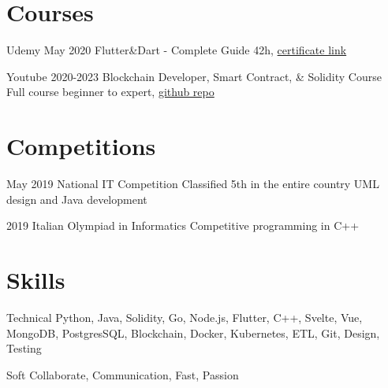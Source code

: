 \documentclass{tccv}
\begin{document}
\section{Courses}

\begin{yearlist}

\item[Udemy]{May 2020}
     {Flutter\&Dart - Complete Guide}
     {42h, \href{https://www.udemy.com/certificate/UC-c6f5a32f-babc-42f9-8a0a-6effadf9e7cd/}{certificate link}}

\item[Youtube]{2020-2023}
    {Blockchain Developer, Smart Contract, \& Solidity Course}
    {Full course beginner to expert, \href{https://github.com/Cyfrin/foundry-full-course-f23}{github repo}}

\end{yearlist}


\section{Competitions}

\begin{yearlist}

\item[]{May 2019}
     {National IT Competition}
     {Classified 5th in the entire country \newline
     UML design and Java development}

\item[]{2019}
    {Italian Olympiad in Informatics}
    {Competitive programming in C++}

\end{yearlist}


\section{Skills}

\begin{factlist}

\item{Technical}
     {Python, Java, Solidity, Go, Node.js, Flutter, C++, Svelte, Vue, MongoDB, PostgresSQL, Blockchain, Docker, Kubernetes, ETL, Git, Design, Testing}

\item{Soft}
     {Collaborate, Communication, Fast, Passion}

\end{factlist}
\end{document}
